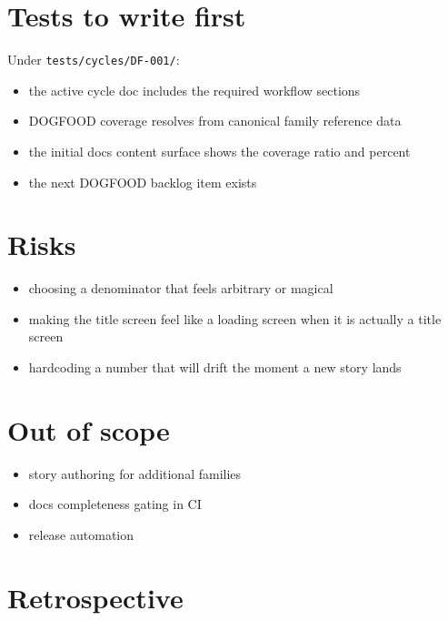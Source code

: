 \section{Tests to write first}\label{record-064-tests-to-write-first}

Under \texttt{t\allowbreak{}e\allowbreak{}s\allowbreak{}t\allowbreak{}s\allowbreak{}/\allowbreak{}c\allowbreak{}y\allowbreak{}c\allowbreak{}l\allowbreak{}e\allowbreak{}s\allowbreak{}/\allowbreak{}D\allowbreak{}F\allowbreak{}-\allowbreak{}0\allowbreak{}0\allowbreak{}1\allowbreak{}/}:

\begin{itemize}
\tightlist
\item
  the active cycle doc includes the required workflow sections
\item
  DOGFOOD coverage resolves from canonical family reference data
\item
  the initial docs content surface shows the coverage ratio and percent
\item
  the next DOGFOOD backlog item exists
\end{itemize}

\section{Risks}\label{record-064-risks}

\begin{itemize}
\tightlist
\item
  choosing a denominator that feels arbitrary or magical
\item
  making the title screen feel like a loading screen when it is actually a title screen
\item
  hardcoding a number that will drift the moment a new story lands
\end{itemize}

\section{Out of scope}\label{record-064-out-of-scope}

\begin{itemize}
\tightlist
\item
  story authoring for additional families
\item
  docs completeness gating in CI
\item
  release automation
\end{itemize}

\section{Retrospective}\label{record-064-retrospective}

